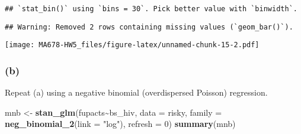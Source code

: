 \documentclass[
]{article}
\newenvironment{Shaded}{\begin{snugshade}}{\end{snugshade}}
\newcommand{\AttributeTok}[1]{\textcolor[rgb]{0.13,0.29,0.53}{#1}}
\newcommand{\DecValTok}[1]{\textcolor[rgb]{0.00,0.00,0.81}{#1}}
\newcommand{\FunctionTok}[1]{\textcolor[rgb]{0.13,0.29,0.53}{\textbf{#1}}}
\newcommand{\NormalTok}[1]{#1}
\newcommand{\OtherTok}[1]{\textcolor[rgb]{0.56,0.35,0.01}{#1}}
\newcommand{\SpecialCharTok}[1]{\textcolor[rgb]{0.81,0.36,0.00}{\textbf{#1}}}
\newcommand{\StringTok}[1]{\textcolor[rgb]{0.31,0.60,0.02}{#1}}
\begin{document}
\begin{Shaded}
\end{Shaded}

\begin{verbatim}
## `stat_bin()` using `bins = 30`. Pick better value with `binwidth`.
\end{verbatim}

\begin{verbatim}
## Warning: Removed 2 rows containing missing values (`geom_bar()`).
\end{verbatim}

\texttt{[image: MA678-HW5\_files/figure-latex/unnamed-chunk-15-2.pdf]}

\hypertarget{b-4}{%
\subsubsection{(b)}\label{b-4}}

Repeat (a) using a negative binomial (overdispersed Poisson) regression.

\begin{Shaded}
\begin{Highlighting}[]
\NormalTok{mnb }\OtherTok{\textless{}{-}} \FunctionTok{stan\_glm}\NormalTok{(fupacts}\SpecialCharTok{\textasciitilde{}}\NormalTok{bs\_hiv, }\AttributeTok{data =}\NormalTok{ risky, }\AttributeTok{family =} \FunctionTok{neg\_binomial\_2}\NormalTok{(}\AttributeTok{link =} \StringTok{"log"}\NormalTok{), }\AttributeTok{refresh =} \DecValTok{0}\NormalTok{)}
\FunctionTok{summary}\NormalTok{(mnb)}
\end{Highlighting}
\end{Shaded}
\end{document}
